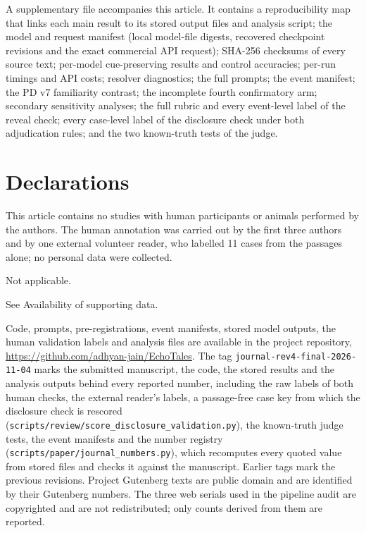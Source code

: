 \documentclass[sn-mathphys]{sn-jnl}%
\theoremstyle{thmstyleone}%
\theoremstyle{thmstyletwo}%
\theoremstyle{thmstylethree}%
\begin{document}
\backmatter

A supplementary file accompanies this article. It contains a reproducibility map that links each main result to its stored output files and analysis script; the model and request manifest (local model-file digests, recovered checkpoint revisions and the exact commercial API request); SHA-256 checksums of every source text; per-model cue-preserving results and control accuracies; per-run timings and API costs; resolver diagnostics; the full prompts; the event manifest; the PD v7 familiarity contrast; the incomplete fourth confirmatory arm; secondary sensitivity analyses; the full rubric and every event-level label of the reveal check; every case-level label of the disclosure check under both adjudication rules; and the two known-truth tests of the judge.

\section*{Declarations}

 This article contains no studies with human participants or animals performed by the authors. The human annotation was carried out by the first three authors and by one external volunteer reader, who labelled 11 cases from the passages alone; no personal data were collected.

 Not applicable.

 See Availability of supporting data.

 Code, prompts, pre-registrations, event manifests, stored model outputs, the human validation labels and analysis files are available in the project repository, \url{https://github.com/adhyan-jain/EchoTales}. The tag \texttt{journal-rev4-final-2026-11-04} marks the submitted manuscript, the code, the stored results and the analysis outputs behind every reported number, including the raw labels of both human checks, the external reader's labels, a passage-free case key from which the disclosure check is rescored (\texttt{scripts/review/score\_disclosure\_validation.py}), the known-truth judge tests, the event manifests and the number registry (\texttt{scripts/paper/journal\_numbers.py}), which recomputes every quoted value from stored files and checks it against the manuscript. Earlier tags mark the previous revisions. Project Gutenberg texts are public domain and are identified by their Gutenberg numbers. The three web serials used in the pipeline audit are copyrighted and are not redistributed; only counts derived from them are reported.
\end{document}
